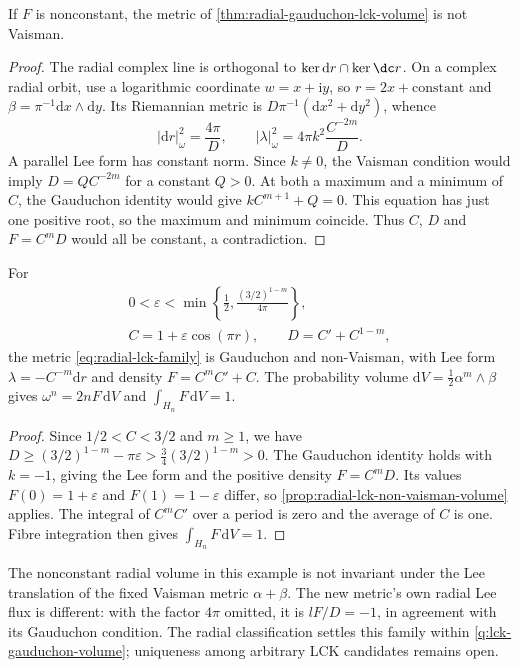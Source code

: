 \begin{proposition}\label{prop:radial-lck-non-vaisman-volume}
If $F$ is nonconstant, the metric of \cref{thm:radial-gauduchon-lck-volume} is not Vaisman.
\end{proposition}
\begin{proof}
The radial complex line is orthogonal to $\ker\mathrm dr\cap\ker\dc r$. On a complex radial orbit, use a logarithmic coordinate $w=x+\mathrm i y$, so $r=2x+\text{constant}$ and $\beta=\pi^{-1}\mathrm dx\wedge\mathrm dy$. Its Riemannian metric is $D\pi^{-1}(\mathrm dx^2+\mathrm dy^2)$, whence
\[
 |\mathrm dr|_\omega^2=\frac{4\pi}{D},\qquad
 |\lambda|_\omega^2=4\pi k^2\frac{C^{-2m}}{D}.
\]
A parallel Lee form has constant norm. Since $k\ne0$, the Vaisman condition would imply $D=Q C^{-2m}$ for a constant $Q>0$. At both a maximum and a minimum of $C$, the Gauduchon identity would give $kC^{m+1}+Q=0$. This equation has just one positive root, so the maximum and minimum coincide. Thus $C$, $D$ and $F=C^mD$ would all be constant, a contradiction.
\end{proof}

\begin{example}\label{ex:radial-gauduchon-non-vaisman}
For
\[
 \begin{gathered}
 0<\varepsilon<\min\left\{\frac12,
                \frac{(3/2)^{1-m}}{4\pi}\right\},
 \\
 C=1+\varepsilon\cos(\pi r),\qquad
 D=C'+C^{1-m},
 \end{gathered}
\]
the metric \eqref{eq:radial-lck-family} is Gauduchon and non-Vaisman, with Lee form $\lambda=-C^{-m}\mathrm dr$ and density $F=C^mC'+C$. The probability volume $\mathrm dV=\frac12\alpha^m\wedge\beta$ gives $\omega^n=2nF\,\mathrm dV$ and $\int_{H_n}F\,\mathrm dV=1$.
\end{example}
\begin{proof}
Since $1/2<C<3/2$ and $m\geq1$, we have
$D\geq(3/2)^{1-m}-\pi\varepsilon>\frac34(3/2)^{1-m}>0$.
The Gauduchon identity holds with $k=-1$, giving the Lee form and the positive density $F=C^mD$. Its values $F(0)=1+\varepsilon$ and $F(1)=1-\varepsilon$ differ, so \cref{prop:radial-lck-non-vaisman-volume} applies. The integral of $C^mC'$ over a period is zero and the average of $C$ is one. Fibre integration then gives $\int_{H_n}F\,\mathrm dV=1$.
\end{proof}

The nonconstant radial volume in this example is not invariant under the Lee translation of the fixed Vaisman metric $\alpha+\beta$. The new metric's own radial Lee flux is different: with the factor $4\pi$ omitted, it is $lF/D=-1$, in agreement with its Gauduchon condition. The radial classification settles this family within \cref{q:lck-gauduchon-volume}; uniqueness among arbitrary LCK candidates remains open.
